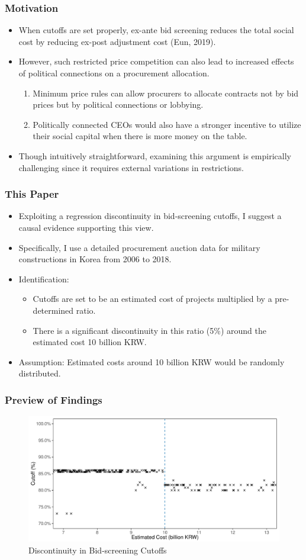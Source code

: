 \documentclass{beamer}
\begin{document}
\begin{frame}
\frametitle{Motivation}
\begin{itemize}
\item When cutoffs are set properly, ex-ante bid screening reduces the total social cost by reducing ex-post adjustment cost (Eun, 2019).
\item However, such restricted price competition can also lead to increased effects of political connections on a procurement allocation.
	\begin{enumerate}
	\item Minimum price rules can allow procurers to allocate contracts not by bid prices but by political connections or lobbying.
	\item Politically connected CEOs would also have a stronger incentive to utilize their social capital when there is more money on the table.
	\end{enumerate}
\item Though intuitively straightforward, examining this argument is empirically challenging since it requires external variations in restrictions.
\end{itemize}
\end{frame}

\begin{frame}
\frametitle{This Paper}
\begin{itemize}
\item Exploiting a regression discontinuity in bid-screening cutoffs, I suggest a causal evidence supporting this view.
\item Specifically, I use a detailed procurement auction data for military constructions in Korea from 2006 to 2018.
\item Identification:
	\begin{itemize}
	\item Cutoffs are set to be an estimated cost of projects multiplied by a pre-determined ratio.
	\item There is a significant discontinuity in this ratio (5\%) around the estimated cost 10 billion KRW.
	\end{itemize}
\item Assumption: Estimated costs around 10 billion KRW would be randomly distributed.
\end{itemize}
\end{frame}

\begin{frame}
\frametitle{Preview of Findings}
\begin{figure} \centering
\includegraphics[width = \linewidth]{../figure/limit.pdf}
\caption{Discontinuity in Bid-screening Cutoffs} \label{}
\end{figure}
\end{frame}
\end{document}
